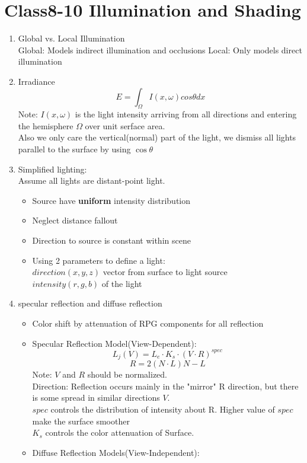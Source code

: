 \documentclass[cyan,normal,en]{elegantnote}
\begin{document}
\section{Class8-10 Illumination and Shading}
\begin{enumerate}
	\item Global vs. Local Illumination\\
	Global: Models indirect illumination and occlusions
	Local: Only models direct illumination
	\item Irradiance
	$$E=\int_{\Omega} I(x,\omega) cos \theta dx$$
	Note: $I(x,\omega)$ is the light intensity arriving from all directions and entering the hemisphere $\Omega$ over unit serface area.\\
	Also we only care the vertical(normal) part of the light, we dismiss all lights parallel to the surface by using $\cos \theta$
	\item Simplified lighting:\\
	Assume all lights are distant-point light.
	\begin{itemize}
		\item Source have \textbf{uniform} intensity distribution
		\item Neglect distance fallout
		\item Direction to source is constant within scene
		\item Using 2 parameters to define a light:\\
		$direction(x,y,z)$ vector from surface to light source\\
		$intensity(r,g,b)$ of the light
	\end{itemize}
	\item specular reflection and diffuse reflection
	\begin{itemize}
		\item Color shift by attenuation of RPG components for all reflection
		\item Specular Reflection Model(View-Dependent):\\
		$$L_j(V) = L_e \cdot K_s \cdot (V\cdot R)^{spec}$$
		$$R=2(N\cdot L)N-L$$
		Note: $V$ and $R$ should be normalized.\\
		Direction: Reflection occurs mainly in the "mirror" R direction, but there is some spread in similar directions $V$.\\
		$spec$ controls the distribution of intensity about R. Higher value of $spec$ make the surface smoother\\
		$K_s$ controls the color attenuation of Surface.
		\item Diffuse Reflection Models(View-Independent):\\

\end{itemize}
\end{enumerate}
\end{document}
